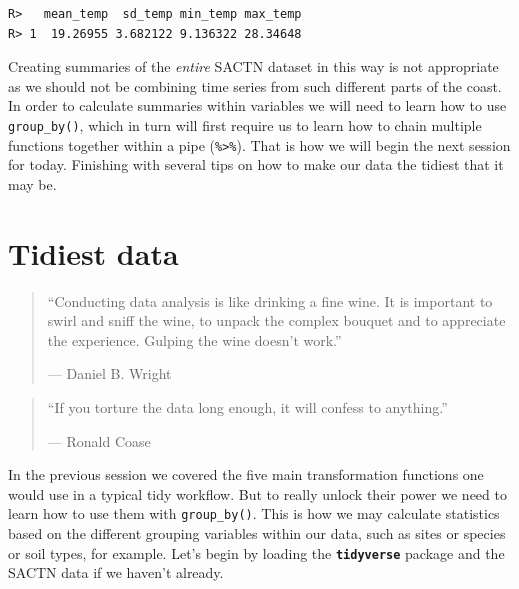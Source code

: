 \documentclass[]{book}
\newenvironment{Shaded}{\begin{snugshade}}{\end{snugshade}}
\newcommand{\KeywordTok}[1]{\textcolor[rgb]{0.13,0.29,0.53}{\textbf{#1}}}
\newcommand{\DataTypeTok}[1]{\textcolor[rgb]{0.13,0.29,0.53}{#1}}
\newcommand{\DecValTok}[1]{\textcolor[rgb]{0.00,0.00,0.81}{#1}}
\newcommand{\StringTok}[1]{\textcolor[rgb]{0.31,0.60,0.02}{#1}}
\newcommand{\CommentTok}[1]{\textcolor[rgb]{0.56,0.35,0.01}{\textit{#1}}}
\newcommand{\OperatorTok}[1]{\textcolor[rgb]{0.81,0.36,0.00}{\textbf{#1}}}
\newcommand{\NormalTok}[1]{#1}
\theoremstyle{definition}
\theoremstyle{definition}
\theoremstyle{definition}
\theoremstyle{remark}
\begin{document}
\begin{verbatim}
R>   mean_temp  sd_temp min_temp max_temp
R> 1  19.26955 3.682122 9.136322 28.34648
\end{verbatim}

Creating summaries of the \emph{entire} SACTN dataset in this way is not
appropriate as we should not be combining time series from such
different parts of the coast. In order to calculate summaries within
variables we will need to learn how to use \texttt{group\_by()}, which
in turn will first require us to learn how to chain multiple functions
together within a pipe (\texttt{\%\textgreater{}\%}). That is how we
will begin the next session for today. Finishing with several tips on
how to make our data the tidiest that it may be.

\chapter{Tidiest data}\label{tidiest}

\begin{quote}
``Conducting data analysis is like drinking a fine wine. It is important
to swirl and sniff the wine, to unpack the complex bouquet and to
appreciate the experience. Gulping the wine doesn't work.''

--- Daniel B. Wright
\end{quote}

\begin{quote}
``If you torture the data long enough, it will confess to anything.''

--- Ronald Coase
\end{quote}

In the previous session we covered the five main transformation
functions one would use in a typical tidy workflow. But to really unlock
their power we need to learn how to use them with \texttt{group\_by()}.
This is how we may calculate statistics based on the different grouping
variables within our data, such as sites or species or soil types, for
example. Let's begin by loading the \textbf{\texttt{tidyverse}} package
and the SACTN data if we haven't already.

\begin{Shaded}
\end{Shaded}
\end{document}
